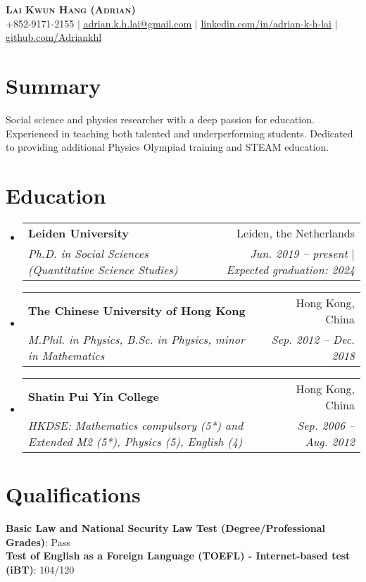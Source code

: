 \documentclass[letterpaper,11pt]{article}
\makeatletter
\newcommand{\resumeSubheading}[4]{
  \vspace{-2pt}\item
    \begin{tabular*}{0.97\textwidth}[t]{l@{\extracolsep{\fill}}r}
      \textbf{#1} & #2 \\
      \textit{\small#3} & \textit{\small #4} \\
    \end{tabular*}\vspace{-7pt}
}
\newcommand{\resumeSubHeadingListStart}{\begin{itemize}[leftmargin=0.15in, label={}]}
\newcommand{\resumeSubHeadingListEnd}{\end{itemize}}
\makeatother
\begin{document}

\begin{center}
    \textbf{\Huge \scshape Lai Kwun Hang (Adrian)} \\ \vspace{1pt}
    \small +852-9171-2155 $|$ \href{mailto:adrian.k.h.lai@gmail.com}{\underline{adrian.k.h.lai@gmail.com}} $|$ 
    \href{https://www.linkedin.com/in/adrian-k-h-lai}{\underline{linkedin.com/in/adrian-k-h-lai}} $|$
    \href{https://github.com/Adriankhl}{\underline{github.com/Adriankhl}}
\end{center}


\section{Summary}
Social science and physics researcher with a deep passion for education. 
Experienced in teaching both talented and underperforming students.
Dedicated to providing additional Physics Olympiad training and STEAM education.

\section{Education}
  \resumeSubHeadingListStart
    \resumeSubheading
      {Leiden University}{Leiden, the Netherlands}
      {Ph.D. in Social Sciences (Quantitative Science Studies)}{Jun. 2019 -- present $|$ Expected graduation: 2024}
    \resumeSubheading
      {The Chinese University of Hong Kong}{Hong Kong, China}
      {M.Phil. in Physics, B.Sc. in Physics, minor in Mathematics}{Sep. 2012 -- Dec. 2018}
    \resumeSubheading
      {Shatin Pui Yin College}{Hong Kong, China}
      {HKDSE: Mathematics compulsory (5*) and Extended M2 (5*), Physics (5), English (4)}{Sep. 2006 -- Aug. 2012}
  \resumeSubHeadingListEnd

\section{Qualifications}
 \begin{itemize}[leftmargin=0.15in, label={}]
    \small{\item{
      \textbf{Basic Law and National Security Law Test (Degree/Professional Grades)}{: Pass} \\
      \textbf{Test of English as a Foreign Language (TOEFL) - Internet-based test (iBT)}{: 104/120}
    }}
 \end{itemize}
\end{document}
